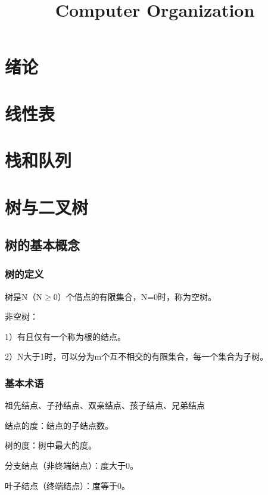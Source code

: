 \documentclass{ctexart}
\title{Computer Organization}
\author{}
\date{}
\begin{document}
\maketitle

\newpage

\tableofcontents




\section{绪论}

\section{线性表}

\section{栈和队列}

\section{树与二叉树}



\subsection{树的基本概念}


\subsubsection{树的定义}

树是N（N$\geq$0）个借点的有限集合，N=0时，称为空树。

非空树：

1）有且仅有一个称为根的结点。

2）N大于1时，可以分为m个互不相交的有限集合，每一个集合为子树。


\subsubsection{基本术语}

祖先结点、子孙结点、双亲结点、孩子结点、兄弟结点

结点的度：结点的子结点数。

树的度：树中最大的度。

分支结点（非终端结点）：度大于0。

叶子结点（终端结点）：度等于0。
\end{document}
